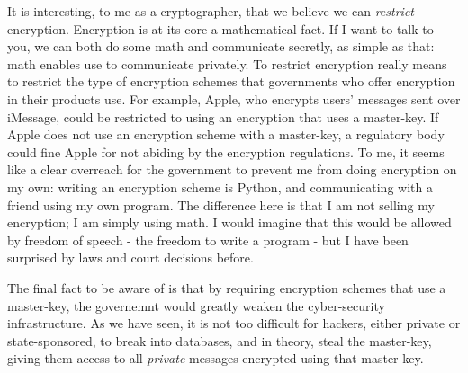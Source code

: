 \documentclass[11pt]{article}
\begin{document}
It is interesting, to me as a cryptographer, that we believe we can \textit{restrict} encryption.
Encryption is at its core a mathematical fact.
If I want to talk to you, we can both do some math and communicate secretly, as simple as that: math enables use to communicate privately.
To restrict encryption really means to restrict the type of encryption schemes that governments who offer encryption in their products use.
For example, Apple, who encrypts users' messages sent over iMessage, could be restricted to using an encryption that uses a master-key.
If Apple does not use an encryption scheme with a master-key, a regulatory body could fine Apple for not abiding by the encryption regulations.
To me, it seems like a clear overreach for the government to prevent me from doing encryption on my own: writing an encryption scheme is Python, and communicating with a friend using my own program.
The difference here is that I am not selling my encryption; I am simply using math.
I would imagine that this would be allowed by freedom of speech - the freedom to write a program - but I have been surprised by laws and court decisions before.

The final fact to be aware of is that by requiring encryption schemes that use a master-key, the governemnt would greatly weaken the cyber-security infrastructure.
As we have seen, it is not too difficult for hackers, either private or state-sponsored, to break into databases, and in theory, steal the master-key, giving them access to all \textit{private} messages encrypted using that master-key.

%
%
\end{document}
